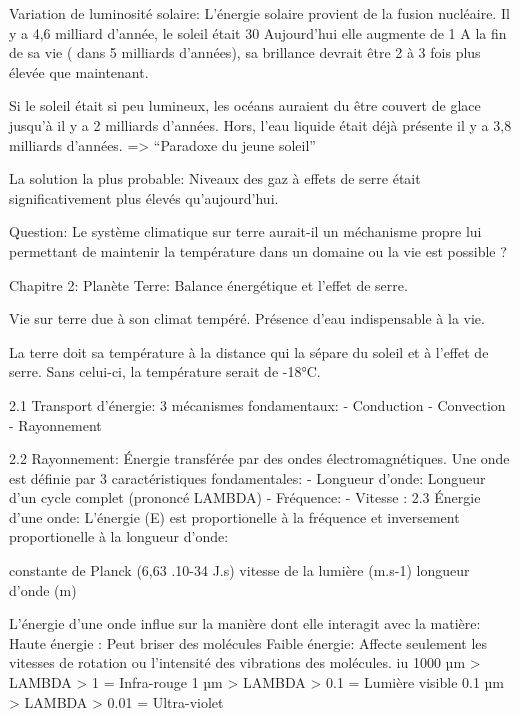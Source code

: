 Variation de luminosité solaire:
L’énergie solaire provient de la fusion nucléaire.
Il y a 4,6 milliard d’année, le soleil était 30%
Aujourd’hui elle augmente de 1 %
A la fin de sa vie ( dans 5 milliards d’années), sa brillance devrait être 2 à 3 fois plus élevée que maintenant.






Si le soleil était si peu lumineux, les océans auraient du être couvert de glace jusqu’à il y a 2 milliards d’années. Hors, l’eau liquide était déjà présente il y a 3,8 milliards d’années.
=> “Paradoxe du jeune soleil”


La solution la plus probable: Niveaux des gaz à effets de serre était significativement plus élevés qu'aujourd'hui.


Question: Le système climatique sur terre aurait-il un méchanisme propre lui permettant de maintenir la température dans un domaine ou la vie est possible ?






Chapitre 2: Planète Terre: Balance énergétique  et l’effet de serre.


Vie sur terre due à son climat tempéré.
Présence d’eau indispensable à la vie.


La terre doit sa température à la distance qui la sépare du soleil et à l’effet de serre. Sans celui-ci, la température serait de -18°C.


2.1 Transport d’énergie:
3 mécanismes fondamentaux:
- Conduction
- Convection
- Rayonnement
	  

	





2.2 Rayonnement:
Énergie transférée par des ondes électromagnétiques.
Une onde est définie par 3 caractéristiques fondamentales:
- Longueur d’onde: Longueur d’un cycle complet (prononcé LAMBDA)
- Fréquence: 
- Vitesse : 
2.3 Énergie d’une onde:
L’énergie (E) est proportionelle à la fréquence et inversement proportionelle à la longueur d’onde:

constante de Planck (6,63 .10-34 J.s)
vitesse de la lumière (m.s-1)
longueur d’onde (m)


L’énergie d’une onde influe sur la manière dont elle interagit avec la matière:
Haute énergie : Peut briser des molécules
Faible énergie: Affecte seulement les vitesses de rotation ou l’intensité des vibrations des molécules.
iu 
1000 µm > LAMBDA > 1 = Infra-rouge
1 µm > LAMBDA > 0.1 = Lumière visible
0.1 µm > LAMBDA > 0.01 = Ultra-violet


